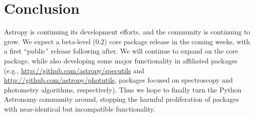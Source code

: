 \section{Conclusion}
Astropy is continuing its development efforts, and the community is continuing to grow.  We expect a beta-level (0.2) core package release in the coming weeks, with a first ``public'' release following after.  We will continue to expand on the core package, while also developing some major functionality in affiliated packages (e.g., \url{http://github.com/astropy/specutils} and \url{http://github.com/astropy/photutils}, packages focused on spectroscopy and photometry algorithms, respectively). Thus we hope to finally turn the Python Astronomy community around, stopping the harmful proliferation of packages with near-identical but incompatible functionality.
